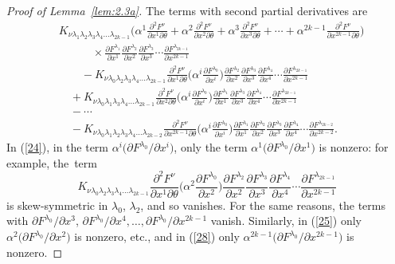 \documentclass[pdftex]{sigma}
\numberwithin{equation}{section}
\theoremstyle{definition}
\begin{document}
\begin{proof}[Proof of Lemma~\ref{lem:2.3a}]
The terms with second partial derivatives are
\begin{align}
&K_{\nu\lambda_1\lambda_2\lambda_3\lambda_4\dots\lambda_{2k-1}}\biggl(\alpha^1 \frac{\partial^2F^\nu}{\partial x^1\partial\theta}+ \alpha^2 \frac{\partial^2F^\nu}{\partial x^2\partial\theta}
+\alpha^3 \frac{\partial^2F^\nu}{\partial x^3\partial\theta} +\cdots
+\alpha^{2k-1} \frac{\partial^2F^\nu}{\partial x^{2k-1}\partial\theta}
\biggr)\nonumber\\
&\qquad \quad{} \times \frac{\partial F^{\lambda_1}}{\partial x^1}\frac{\partial F^{\lambda_2}}{\partial x^2}
\frac{\partial F^{\lambda_3}}{\partial x^3}
\cdots\frac{\partial F^{\lambda_{2k-1}}}{\partial x^{2k-1}}\label{23}\\
&\qquad{} -K_{\nu\lambda_0\lambda_2\lambda_3\lambda_4\dots \lambda_{2k-1}}\frac{\partial^2F^\nu}{\partial x^1\partial\theta}
\biggl( \alpha^i\frac{\partial F^{\lambda_0}}{\partial x^i}\biggr)
\frac{\partial F^{\lambda_2}}{\partial x^2}
\frac{\partial F^{\lambda_3}}{\partial x^3}\frac{\partial F^{\lambda_4}}{\partial x^4}\cdots
\frac{\partial F^{\lambda_{2k-1}}}{\partial x^{2k-1}}
\label{24}\\
&\quad + K_{\nu\lambda_0\lambda_1\lambda_3\lambda_4\dots\lambda_{2k-1}}\frac{\partial^2F^\nu}{\partial x^2\partial\theta}
\biggl( \alpha^i\frac{\partial F^{\lambda_0}}{\partial x^i}\biggr)
\frac{\partial F^{\lambda_1}}{\partial x^1}\frac{\partial F^{\lambda_3}}{\partial x^3}
\frac{\partial F^{\lambda_4}}{\partial x^4}\cdots \frac{\partial F^{\lambda_{2k-1}}}{\partial x^{2k-1}}\label{25}\\
&\quad -\cdots\nonumber\\
&\quad - K_{\nu\lambda_0\lambda_1\lambda_2\lambda_3\lambda_4\dots\lambda_{2k-2}}\frac{\partial^2F^\nu}{\partial x^{2k-1}\partial\theta}
\biggl( \alpha^i\frac{\partial F^{\lambda_0}}{\partial x^i}\biggr)
\frac{\partial F^{\lambda_1}}{\partial x^1}\frac{\partial F^{\lambda_2}}{\partial x^2}
\frac{\partial F^{\lambda_3}}{\partial x^3}\frac{\partial F^{\lambda_4}}{\partial x^4}\cdots
\frac{\partial F^{\lambda_{2k-2}}}{\partial x^{2k-2}}.
\label{28}
\end{align}
In (\ref{24}), in the term $\alpha^i \bigl(\partial F^{\lambda_0}/\partial x^i\bigr)$, only the term $\alpha^1 \bigl(\partial F^{\lambda_0}/\partial x^1\bigr)$ is nonzero: for example, the~term
\[K_{\nu\lambda_0\lambda_2\lambda_3\lambda_4\dots \lambda_{2k-1}}\frac{\partial^2F^\nu}{\partial x^1\partial\theta}
\biggl( \alpha^2\frac{\partial F^{\lambda_0}}{\partial x^2}\biggr) \frac{\partial F^{\lambda_2}}{\partial x^2}
\frac{\partial F^{\lambda_3}}{\partial x^3}\frac{\partial F^{\lambda_4}}{\partial x^4}\cdots
\frac{\partial F^{\lambda_{2k-1}}}{\partial x^{2k-1}}\]
is skew-symmetric in $\lambda_0$, $\lambda_2$, and so vanishes. For the same reasons, the terms with
$\partial F^{\lambda_0}/\partial x^3$, $ \partial F^{\lambda_0}/\partial x^4, \dots, \partial F^{\lambda_0}/\partial x^{2k-1}$ vanish.
 Similarly, in (\ref{25}) only $\alpha^2 \bigl(\partial F^{\lambda_0}/\partial x^2\bigr)$ is nonzero, etc.,
and in (\ref{28}) only $\alpha^{2k-1} \bigl(\partial F^{\lambda_0}/\partial x^{2k-1}\bigr)$ is nonzero.


\end{proof}
\end{document}
